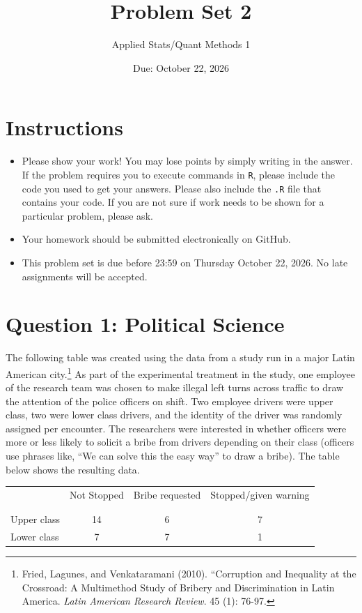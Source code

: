 \documentclass[12pt,letterpaper]{article}
\title{Problem Set 2}
\date{Due: October 22, 2026}
\author{Applied Stats/Quant Methods 1}
\begin{document}
	\maketitle
	\section*{Instructions}
\begin{itemize}
	\item Please show your work! You may lose points by simply writing in the answer. If the problem requires you to execute commands in \texttt{R}, please include the code you used to get your answers. Please also include the \texttt{.R} file that contains your code. If you are not sure if work needs to be shown for a particular problem, please ask.
	\item Your homework should be submitted electronically on GitHub.
	\item This problem set is due before 23:59 on Thursday October 22, 2026. No late assignments will be accepted.

\end{itemize}

	
	\vspace{.5cm}
	\section*{Question 1: Political Science}
		\vspace{.25cm}
	The following table was created using the data from a study run in a major Latin American city.\footnote{Fried, Lagunes, and Venkataramani (2010). ``Corruption and Inequality at the Crossroad: A Multimethod Study of Bribery and Discrimination in Latin America. \textit{Latin American Research Review}. 45 (1): 76-97.} As part of the experimental treatment in the study, one employee of the research team was chosen to make illegal left turns across traffic to draw the attention of the police officers on shift. Two employee drivers were upper class, two were lower class drivers, and the identity of the driver was randomly assigned per encounter. The researchers were interested in whether officers were more or less likely to solicit a bribe from drivers depending on their class (officers use phrases like, ``We can solve this the easy way'' to draw a bribe). The table below shows the resulting data.

\newpage
\begin{table}[h!]
	\centering
	\begin{tabular}{l | c c c }
		& Not Stopped & Bribe requested & Stopped/given warning \\
		\\[-1.8ex] 
		\hline \\[-1.8ex]
		Upper class & 14 & 6 & 7 \\
		Lower class & 7 & 7 & 1 \\
		\hline
	\end{tabular}
\end{table}
\end{document}
